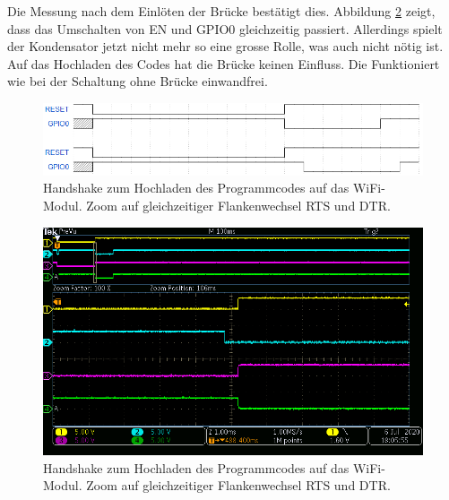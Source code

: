 Die Messung nach dem Einlöten der Brücke bestätigt dies. Abbildung \ref{fig:ESP32_RTS_DTR_EN_IO0_mit_Bruecke_1} zeigt, dass das Umschalten von EN und GPIO0 gleichzeitig passiert. Allerdings spielt der Kondensator jetzt nicht mehr so eine grosse Rolle, was auch nicht nötig ist. Auf das Hochladen des Codes hat die Brücke keinen Einfluss. Die Funktioniert wie bei der Schaltung ohne Brücke einwandfrei.


\begin{figure}[H]
\center
\includegraphics[width = \textwidth]{graphics/ESP32_Handshake_Forum}
\caption{Handshake zum Hochladen des Programmcodes auf das WiFi-Modul. Zoom auf gleichzeitiger Flankenwechsel RTS und DTR. \cite{liudr_trying_2017}}
\label{fig:ESP32_Handshake_Forum}
\end{figure}

\begin{figure}[H]
\center
\includegraphics[width = \textwidth]{graphics/ESP32_RTS_DTR_EN_IO0_mit_Bruecke_1}
\caption{Handshake zum Hochladen des Programmcodes auf das WiFi-Modul. Zoom auf gleichzeitiger Flankenwechsel RTS und DTR.}
\label{fig:ESP32_RTS_DTR_EN_IO0_mit_Bruecke_1}
\end{figure}
